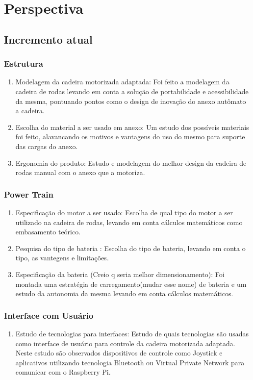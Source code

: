 \chapter[Perspectiva]{Perspectiva}

\section{Incremento atual}
  \subsection{Estrutura}
    \begin{enumerate}
      \item Modelagem da cadeira motorizada adaptada: Foi feito a modelagem da cadeira de rodas levando em conta a solução de portabilidade e acessibilidade da mesma, pontuando pontos como o design de inovação do anexo autômato a cadeira.

      \item Escolha do material a ser usado em anexo: Um estudo dos possíveis materiais foi feito, alavancando os motivos e vantagens do uso do mesmo para suporte das cargas do anexo.

      \item Ergonomia do produto: Estudo e modelagem do melhor design da cadeira de rodas manual com o anexo que a motoriza.
    \end{enumerate}
  \subsection{Power Train}
    \begin{enumerate}
      \item Especificação do motor a ser usado: Escolha de qual tipo do motor a ser utilizado na cadeira de rodas, levando em conta cálculos matemáticos como embasamento teórico.

      \item Pesquisa do tipo de bateria : Escolha do tipo de bateria, levando em conta o tipo, as vantegens e limitações.

      \item Especificação da bateria (Creio q seria melhor dimensionamento): Foi montada uma estratégia de carregamento(mudar esse nome) de bateria e um estudo da autonomia da mesma levando em conta cálculos matemáticos.
    \end{enumerate}

  \subsection{Interface com Usuário}
    \begin{enumerate}
      \item Estudo de tecnologias para interfaces: Estudo de quais tecnologias são usadas como interface de usuário para controle da cadeira motorizada adaptada. Neste estudo são observados dispositivos de controle como Joystick e aplicativos utilizando tecnologia Bluetooth ou Virtual Private Network para comunicar com o Raspberry Pi.
    \end{enumerate}

